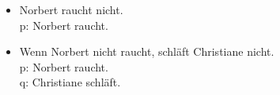 \begin{frame}
\begin{table}
\begin{minipage}{0.3\textwidth}
\centering
\begin{itemize}
\item[] \small{Norbert raucht nicht.\\
               p: Norbert raucht.}
\end{itemize}
\end{minipage}
%
\begin{minipage}{0.65\textwidth}
\centering
\begin{itemize}
\item[] \small{Wenn Norbert nicht raucht, schläft Christiane nicht.\\
               p: Norbert raucht.\\
               q: Christiane schläft.}
\end{itemize}
\end{minipage}
\end{table}

\end{frame}

%

